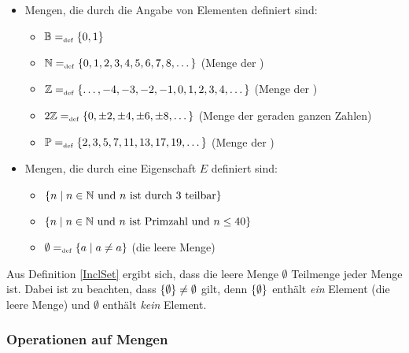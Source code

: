 \begin{example}
\mbox{}

\begin{itemize}
%
\item Mengen, die durch die Angabe von Elementen definiert sind:
\begin{itemize}
  \item $\mathbb{B} =_{\mathrm{\scriptscriptstyle def}} \{0,1\}$
  \item $\mathbb N =_{\mathrm{\scriptscriptstyle def}} \{0, 1, 2, 3, 4, 5, 6, 7, 8, \dots\}$ (Menge der
  )\index{$\N$}
  \item $\mathbb Z =_{\mathrm{\scriptscriptstyle def}} \{\dots, -4, -3, -2, -1, 0, 1, 2, 3, 4, \dots\}$
  (Menge der )\index{$\Z$}
  \item $2\mathbb Z =_{\mathrm{\scriptscriptstyle def}} \{0, \pm 2, \pm 4, \pm 6, \pm 8, \dots\}$
  (Menge der geraden ganzen Zahlen)\index{$2\Z$}
  \item $\mathbb{P} =_{\mathrm{\scriptscriptstyle def}} \{2, 3, 5, 7, 11, 13, 17, 19, \dots\}$
  (Menge der )\index{$\PRIM$}
\end{itemize}
%
\item Mengen, die durch eine Eigenschaft $E$ definiert sind:
\begin{itemize}
%
\item $\{n \mid n \in \mathbb N \text{ und $n$ ist durch $3$ teilbar}\}$
%
\item $\{n \mid n \in \mathbb N \text{ und $n$ ist Primzahl und $n \le 40$}\}$
%
\item $\emptyset =_{\mathrm{\scriptscriptstyle def}} \{a \mid a \not= a\}$ (die leere Menge)\index{$\emptyset$}
%
\end{itemize}
\end{itemize}
Aus Definition \ref{InclSet} ergibt sich, dass die leere Menge
$\emptyset$ Teilmenge jeder Menge ist. Dabei ist zu beachten, dass 
$\{\emptyset\} \not= \emptyset$\index{$\set{\emptyset}$} gilt, denn $\set{\emptyset}$ 
enthält \emph{ein} Element (die leere Menge) und $\emptyset$ enthält \emph{kein} Element.
\end{example}

\subsubsection{Operationen auf Mengen}
\label{OpSetSect}

